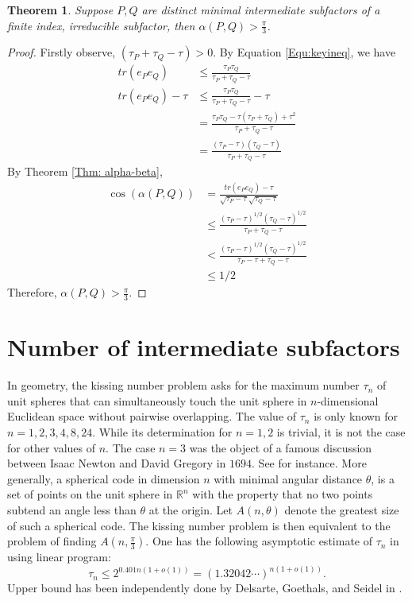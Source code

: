 \documentclass[11pt,letterpaper]{amsart}
\newtheorem{theorem}{Theorem}[section]
\theoremstyle{definition}
\theoremstyle{remark}
\begin{document}
\begin{theorem}
 \label{bound}
Suppose $P,Q$ are distinct minimal intermediate subfactors of a finite index, irreducible subfactor, then $\alpha(P,Q)> \frac{\pi}{3}$.
\end{theorem}
\begin{proof}
Firstly observe, $(\tau_P+\tau_Q-{\tau})>0$.
	By Equation \eqref{Equ:keyineq}, we have
	\begin{align*}
	tr(e_Pe_Q)&\leq\frac{\tau_P\tau_Q}{\tau_P+\tau_Q-\tau}\\
	tr(e_Pe_Q)-\tau &\leq\frac{\tau_P\tau_Q}{\tau_P+\tau_Q-\tau}-\tau\\
	&=\frac{\tau_P\tau_Q-\tau(\tau_P+\tau_Q)+{\tau}^2}{\tau_P+\tau_Q-{\tau}}\\
	&=\frac{(\tau_P-\tau)(\tau_Q-\tau)}{\tau_P+\tau_Q-\tau}
	\end{align*}
	By Theorem \ref{Thm: alpha-beta},
	\begin{align*}
	\cos(\alpha(P,Q)) &=\frac{tr(e_Pe_Q)-\tau}{\sqrt{\tau_P-\tau}\sqrt{\tau_Q-\tau}}\\
	&\leq\displaystyle\frac{(\tau_P-\tau)^{1/2}(\tau_Q-\tau)^{1/2}}{\tau_P+\tau_Q-\tau} \\
	&<\displaystyle\frac{(\tau_P-\tau)^{1/2}(\tau_Q-\tau)^{1/2}}{\tau_P-\tau+\tau_Q-\tau}\\
	&\leq 1/2	
	\end{align*}
	Therefore, $\alpha(P,Q) > \frac{\pi}{3}$.
\end{proof}


 \section{Number of intermediate subfactors}\label{Sec:number}


In geometry, the kissing number problem asks for the maximum number ${\tau}_n$
of unit spheres that can simultaneously touch the unit sphere in $n$-dimensional
Euclidean space without pairwise overlapping. The value of ${\tau}_n $ is only known for
$n = 1, 2, 3, 4, 8, 24.$ While its determination for $n = 1, 2$ is trivial, it is not the case
for other values of $n.$ The case $n = 3$ was the object of a famous discussion between Isaac Newton
and David Gregory in $1694$. See \cite{Cas} for instance. More generally, a spherical code in dimension $n$ with minimal angular distance $\theta$, is a set of points on the
unit sphere in $\mathbb{R}^n$ with the property that no two points subtend an angle less than
$\theta$ at the origin. Let $A(n,\theta)$ denote the greatest size of such a spherical code. The kissing number problem is then equivalent to the
problem of finding $A(n, \frac{\pi}{3})$. One has the following asymptotic estimate of ${{\tau}_n}$ in \cite{KL} using linear program:
$$ {\tau}_n\leq 2^{0.401n(1+o(1))} = {(1.32042 \cdots)}^{n(1+o(1))}.$$
Upper bound has been independently done by Delsarte, Goethals, and Seidel in  \cite{DGS}.
\end{document}
